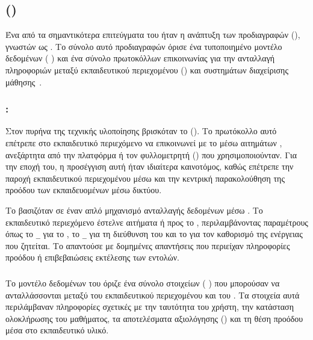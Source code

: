 \subsection{   ()}
\label{subsec:aicc_cmi}

Ένα από τα σημαντικότερα επιτεύγματα του  ήταν η ανάπτυξη των προδιαγραφών \textit{  } (), γνωστών ως . Το σύνολο αυτό προδιαγραφών όρισε ένα τυποποιημένο μοντέλο δεδομένων (\textit{ }) και ένα σύνολο πρωτοκόλλων επικοινωνίας για την ανταλλαγή πληροφοριών μεταξύ εκπαιδευτικού περιεχομένου (\textit{}) και συστημάτων διαχείρισης μάθησης~\cite{tlaworks2024evolution}.

\subsubsection{:    }

Στον πυρήνα της τεχνικής υλοποίησης βρισκόταν το \textit{   } (). Το πρωτόκολλο αυτό επέτρεπε στο εκπαιδευτικό περιεχόμενο να επικοινωνεί με το  μέσω αιτημάτων , ανεξάρτητα από την πλατφόρμα ή τον φυλλομετρητή (\textit{}) που χρησιμοποιούνταν. Για την εποχή του, η προσέγγιση αυτή ήταν ιδιαίτερα καινοτόμος, καθώς επέτρεπε την παροχή εκπαιδευτικού περιεχομένου μέσω   και την κεντρική παρακολούθηση της προόδου των εκπαιδευομένων μέσω δικτύου.

Το  βασιζόταν σε έναν απλό μηχανισμό ανταλλαγής δεδομένων μέσω \textit{ }. Το εκπαιδευτικό περιεχόμενο έστελνε αιτήματα   ή  προς το , περιλαμβάνοντας παραμέτρους όπως το \texttt{\_} για το  , το \texttt{\_} για τη διεύθυνση του  και το \texttt{} για τον καθορισμό της ενέργειας που ζητείται. Το  απαντούσε με δομημένες απαντήσεις που περιείχαν πληροφορίες προόδου ή επιβεβαιώσεις εκτέλεσης των εντολών.

\subsubsection{  }

Το μοντέλο δεδομένων του  όριζε ένα σύνολο στοιχείων (\textit{ }) που μπορούσαν να ανταλλάσσονται μεταξύ του εκπαιδευτικού περιεχομένου και του . Τα στοιχεία αυτά περιλάμβαναν πληροφορίες σχετικές με την ταυτότητα του χρήστη, την κατάσταση ολοκλήρωσης του μαθήματος, τα αποτελέσματα αξιολόγησης () και τη θέση προόδου μέσα στο εκπαιδευτικό υλικό.

